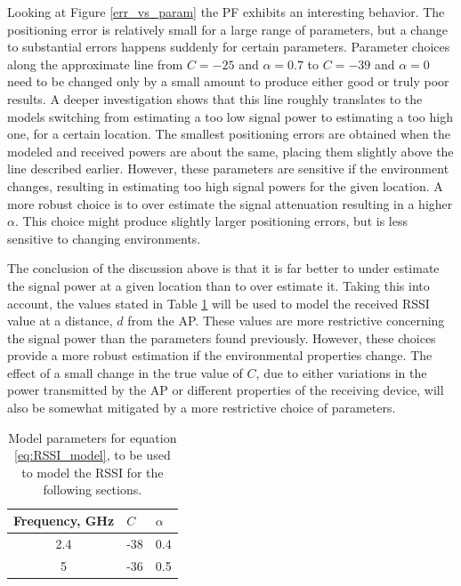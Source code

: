 \documentclass{LTHthesis}
\begin{document}
Looking at Figure \ref{err_vs_param} the PF exhibits an interesting behavior. The positioning error is relatively small for a large range of parameters, but a change to substantial errors happens suddenly for certain parameters. Parameter choices along the approximate line from $C=-25$ and $\alpha=0.7$ to $C=-39$ and $\alpha=0$ need to be changed only by a small amount to produce either good or truly poor results. A deeper investigation shows that this line roughly translates to the models switching from estimating a too low signal power to estimating a too high one, for a certain location. The smallest positioning errors are obtained when the modeled and received powers are about the same, placing them slightly above the line described earlier. However, these parameters are sensitive if the environment changes, resulting in estimating too high signal powers for the given location. A more robust choice is to over estimate the signal attenuation resulting in a higher $\alpha$. This choice might produce slightly larger positioning errors, but is less sensitive to changing environments.

The conclusion of the discussion above is that it is far better to under estimate the signal power at a given location than to over estimate it. Taking this into account, the values stated in Table \ref{table:model_par} will be used to model the received RSSI value at a distance, $d$ from the AP.  These values are more restrictive concerning the signal power than the parameters found previously. However, these choices provide a more robust estimation if the environmental properties change. The effect  of a small change in the true value of $C$, due to either variations in the power transmitted by the AP or different properties of the receiving device, will also be somewhat mitigated by a more restrictive choice of parameters.  
%
\begin{table}
\begin{center}
\begin{tabular}{|c|l|l|}
\hline
Frequency, GHz & $C$ & $\alpha$ \\
\hline
2.4 & -38 & 0.4 \\
\hline
5 & -36 & 0.5 \\
\hline
\end{tabular}
\end{center}
\caption{Model parameters for equation \ref{eq:RSSI_model}, to be used to model the RSSI for the following sections.}\label{table:model_par}
\end{table}
  
\end{document}
